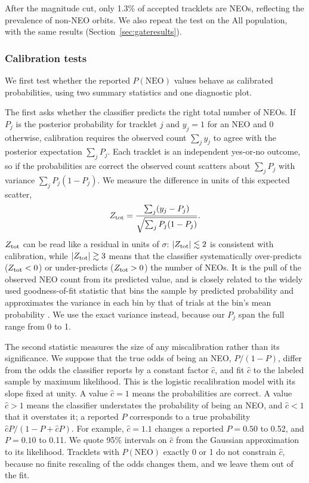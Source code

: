 \documentclass[linenumbers,twocolumn]{aastex701}
\begin{document}
After the magnitude cut, only 1.3\% of accepted tracklets are NEOs, reflecting the prevalence of non-NEO orbits. We also repeat the test on the All population, with the same results (Section~\ref{sec:gateresults}).

\subsubsection{Calibration tests}
\label{sec:gatestats}

We first test whether the reported $P(\mathrm{NEO})$ values behave as calibrated
probabilities, using two summary statistics and one diagnostic plot.

The first asks whether the classifier predicts the right total number of
NEOs. If $P_j$ is the posterior probability for tracklet $j$ and $y_j=1$ for
an NEO and 0 otherwise, calibration requires the observed count $\sum_j y_j$
to agree with the posterior expectation $\sum_j P_j$. Each tracklet is an
independent yes-or-no outcome, so if the probabilities are correct the
observed count scatters about $\sum_j P_j$ with variance $\sum_j P_j(1-P_j)$.
We measure the difference in units of this expected scatter,
\begin{equation}
Z_{\rm tot} =
\frac{\sum_j (y_j-P_j)}
{\sqrt{\sum_j P_j(1-P_j)}} .
\label{eq:ztot}
\end{equation}
$Z_{\rm tot}$ can be read like a residual in units of $\sigma$:
$|Z_{\rm tot}|\lesssim2$ is consistent with calibration, while
$|Z_{\rm tot}|\gtrsim3$ means that the classifier systematically
over-predicts ($Z_{\rm tot}<0$) or under-predicts ($Z_{\rm tot}>0$) the
number of NEOs. It is the pull of the observed NEO count from its predicted
value, and is closely related to the widely used
goodness-of-fit statistic that bins the sample by predicted probability and
approximates the variance in each bin by that of trials at the bin's mean
probability \citep{hosmer1980}. We use the exact variance instead, because
our $P_j$ span the full range from 0 to 1.

The second statistic measures the size of any miscalibration rather than its
significance. We suppose that the true odds of being an NEO, $P/(1-P)$,
differ from the odds the classifier reports by a constant factor $\hat c$,
and fit $\hat c$ to the labeled sample by maximum likelihood. This is the
logistic recalibration model \citep{cox1958} with its slope fixed at unity.
A value $\hat c=1$ means the probabilities are correct. A value $\hat c>1$
means the classifier understates the probability of being an NEO, and
$\hat c<1$ that it overstates it; a reported $P$ corresponds to a true
probability $\hat cP/(1-P+\hat cP)$. For example, $\hat c=1.1$ changes a
reported $P=0.50$ to 0.52, and $P=0.10$ to 0.11. We quote 95\% intervals on
$\hat c$ from the Gaussian approximation to its likelihood. Tracklets with
$P(\mathrm{NEO})$ exactly 0 or 1 do not constrain $\hat c$, because no finite
rescaling of the odds changes them, and we leave them out of the fit.
\end{document}
